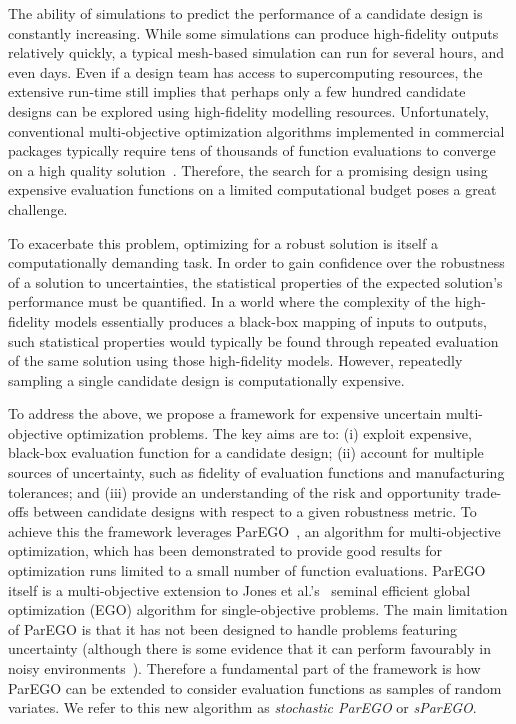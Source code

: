 \documentclass{llncs}
\begin{document}
The ability of simulations to predict the performance of a candidate design is constantly increasing. While some simulations can produce high-fidelity outputs relatively quickly, a typical mesh-based simulation can run for several hours, and even days. Even if a design team has access to supercomputing resources, the extensive run-time still implies that perhaps only a few hundred candidate designs can be explored using high-fidelity modelling resources. Unfortunately, conventional multi-objective optimization algorithms implemented in commercial packages typically require tens of thousands of function evaluations to converge on a high quality solution~\cite{Zhou2011Multiobjective}. Therefore, the search for a promising design using expensive evaluation functions on a limited computational budget poses a great challenge.

To exacerbate this problem, optimizing for a robust solution is itself a computationally demanding task. In order to gain confidence over the robustness of a solution to uncertainties, the statistical properties of the expected solution's performance must be quantified. In a world where the complexity of the high-fidelity models essentially produces a black-box mapping of inputs to outputs, such statistical properties would typically be found through repeated evaluation of the same solution using those high-fidelity models. However, repeatedly sampling a single candidate design is computationally expensive.

To address the above, we propose a framework for expensive uncertain multi-objective optimization problems. The key aims are to: (i) exploit expensive, black-box evaluation function for a candidate design; (ii) account for multiple sources of uncertainty, such as fidelity of evaluation functions and manufacturing tolerances; and (iii) provide an understanding of the risk and opportunity trade-offs between candidate designs with respect to a given robustness metric. To achieve this the framework leverages ParEGO~\cite{Knowles2006ParEGO}, an algorithm for multi-objective optimization, which has been demonstrated to provide good results for optimization runs limited to a small number of function evaluations. ParEGO itself is a multi-objective extension to Jones et al.'s~\cite{Jones1998Efficient} seminal efficient global optimization (EGO) algorithm for single-objective problems. The main limitation of ParEGO is that it has not been designed to handle problems featuring uncertainty (although
there is some evidence that it can perform favourably in noisy environments~\cite{knowles2009noisy}). Therefore a fundamental part of the framework is how ParEGO can be extended to consider evaluation functions as samples of random variates. We refer to this new algorithm as \emph{stochastic ParEGO} or \emph{sParEGO}. 
\end{document}
